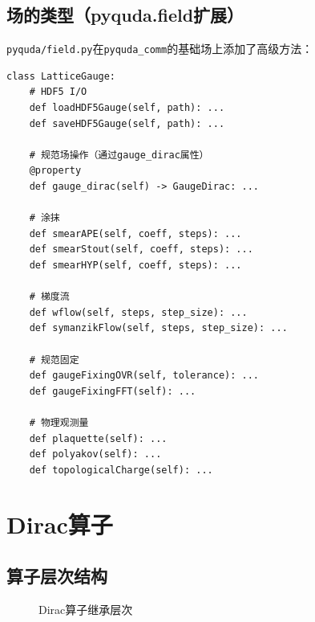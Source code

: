\documentclass[12pt,a4paper]{ctexart}
\begin{document}
\subsection{场的类型（pyquda.field扩展）}

\texttt{pyquda/field.py}在\texttt{pyquda\_comm}的基础场上添加了高级方法：

\begin{lstlisting}[caption={LatticeGauge 高级方法}]
class LatticeGauge:
    # HDF5 I/O
    def loadHDF5Gauge(self, path): ...
    def saveHDF5Gauge(self, path): ...

    # 规范场操作（通过gauge_dirac属性）
    @property
    def gauge_dirac(self) -> GaugeDirac: ...

    # 涂抹
    def smearAPE(self, coeff, steps): ...
    def smearStout(self, coeff, steps): ...
    def smearHYP(self, coeff, steps): ...

    # 梯度流
    def wflow(self, steps, step_size): ...
    def symanzikFlow(self, steps, step_size): ...

    # 规范固定
    def gaugeFixingOVR(self, tolerance): ...
    def gaugeFixingFFT(self): ...

    # 物理观测量
    def plaquette(self): ...
    def polyakov(self): ...
    def topologicalCharge(self): ...
\end{lstlisting}

\section{Dirac算子}

\subsection{算子层次结构}

\begin{figure}[H]
\centering
{}
\caption{Dirac算子继承层次}
\label{fig:dirac}
\end{figure}
\end{document}
